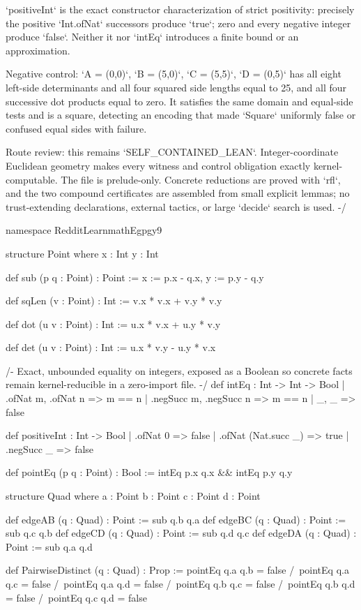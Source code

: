 \documentclass[11pt]{article}
\begin{document}
\begin{Vlean}
`positiveInt` is the exact constructor characterization of strict positivity:
precisely the positive `Int.ofNat` successors produce `true`; zero and every
negative integer produce `false`.  Neither it nor `intEq` introduces a finite
bound or an approximation.

Negative control: `A = (0,0)`, `B = (5,0)`, `C = (5,5)`, `D = (0,5)` has all
eight left-side determinants and all four squared side lengths equal to 25,
and all four successive dot products equal to zero.  It satisfies the same
domain and equal-side tests and is a square, detecting an encoding that made
`Square` uniformly false or confused equal sides with failure.

Route review: this remains `SELF_CONTAINED_LEAN`.  Integer-coordinate Euclidean
geometry makes every witness and control obligation exactly kernel-computable.
The file is prelude-only.  Concrete reductions are proved with `rfl`, and the
two compound certificates are assembled from small explicit lemmas; no
trust-extending declarations, external tactics, or large `decide` search is
used.
-/

namespace RedditLearnmathEgpgy9

structure Point where
  x : Int
  y : Int

def sub (p q : Point) : Point :=
  { x := p.x - q.x, y := p.y - q.y }

def sqLen (v : Point) : Int :=
  v.x * v.x + v.y * v.y

def dot (u v : Point) : Int :=
  u.x * v.x + u.y * v.y

def det (u v : Point) : Int :=
  u.x * v.y - u.y * v.x

/- Exact, unbounded equality on integers, exposed as a Boolean so concrete
facts remain kernel-reducible in a zero-import file. -/
def intEq : Int -> Int -> Bool
  | .ofNat m, .ofNat n => m == n
  | .negSucc m, .negSucc n => m == n
  | _, _ => false

def positiveInt : Int -> Bool
  | .ofNat 0 => false
  | .ofNat (Nat.succ _) => true
  | .negSucc _ => false

def pointEq (p q : Point) : Bool :=
  intEq p.x q.x && intEq p.y q.y

structure Quad where
  a : Point
  b : Point
  c : Point
  d : Point

def edgeAB (q : Quad) : Point := sub q.b q.a
def edgeBC (q : Quad) : Point := sub q.c q.b
def edgeCD (q : Quad) : Point := sub q.d q.c
def edgeDA (q : Quad) : Point := sub q.a q.d

def PairwiseDistinct (q : Quad) : Prop :=
  pointEq q.a q.b = false /\
  pointEq q.a q.c = false /\
  pointEq q.a q.d = false /\
  pointEq q.b q.c = false /\
  pointEq q.b q.d = false /\
  pointEq q.c q.d = false


\end{Vlean}
\end{document}
